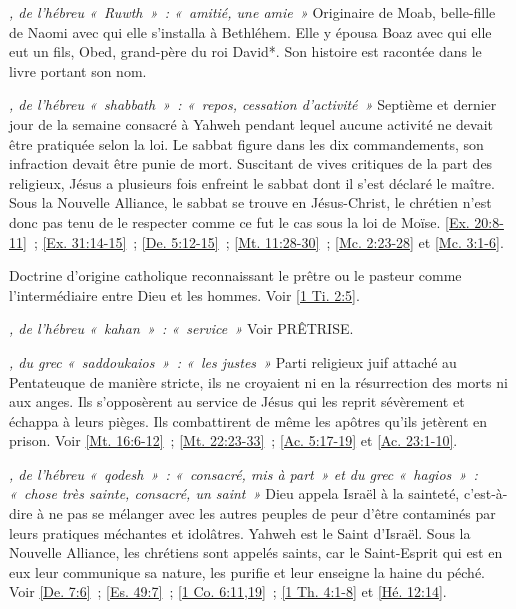 \begin{multicols}{2}
\textit{, de l'hébreu «~Ruwth~»~: «~amitié, une amie~»}\newline
Originaire de Moab, belle-fille de Naomi avec qui elle s'installa à Bethléhem. Elle y épousa Boaz avec qui elle eut un fils, Obed, grand-père du roi David*. Son histoire est racontée dans le livre portant son nom.

\textit{, de l'hébreu «~shabbath~»~: «~repos, cessation d'activité~»}\newline
Septième et dernier jour de la semaine consacré à Yahweh pendant lequel aucune activité ne devait être pratiquée selon la loi. Le sabbat figure dans les dix commandements, son infraction devait être punie de mort. Suscitant de vives critiques de la part des religieux, Jésus a plusieurs fois enfreint le sabbat dont il s'est déclaré le maître. Sous la Nouvelle Alliance, le sabbat se trouve en Jésus-Christ, le chrétien n'est donc pas tenu de le respecter comme ce fut le cas sous la loi de Moïse. \vref{Ex. 20:8-11}~; \vref{Ex. 31:14-15}~; \vref{De. 5:12-15}~; \vref{Mt. 11:28-30}~; \vref{Mc. 2:23-28} et \vref{Mc. 3:1-6}.

\textit{}\newline
Doctrine d'origine catholique reconnaissant le prêtre ou le pasteur comme l'intermédiaire entre Dieu et les hommes. Voir \vref{1 Ti. 2:5}.

\textit{, de l'hébreu «~kahan~»~: «~service~»}\newline
Voir PRÊTRISE.

\textit{, du grec «~saddoukaios~»~: «~les justes~»}\newline
Parti religieux juif attaché au Pentateuque de manière stricte, ils ne croyaient ni en la résurrection des morts ni aux anges. Ils s'opposèrent au service de Jésus qui les reprit sévèrement et échappa à leurs pièges. Ils combattirent de même les apôtres qu'ils jetèrent en prison.\newline
Voir \vref{Mt. 16:6-12}~; \vref{Mt. 22:23-33}~; \vref{Ac. 5:17-19} et \vref{Ac. 23:1-10}.

\textit{, de l'hébreu «~qodesh~»~: «~consacré, mis à part~» et du grec «~hagios~»~: «~chose très sainte, consacré, un saint~»}\newline
Dieu appela Israël à la sainteté, c'est-à-dire à ne pas se mélanger avec les autres peuples de peur d'être contaminés par leurs pratiques méchantes et idolâtres. Yahweh est le Saint d'Israël. Sous la Nouvelle Alliance, les chrétiens sont appelés saints, car le Saint-Esprit qui est en eux leur communique sa nature, les purifie et leur enseigne la haine du péché. Voir \vref{De. 7:6}~; \vref{Es. 49:7}~; \vref{1 Co. 6:11,19}~; \vref{1 Th. 4:1-8} et \vref{Hé. 12:14}.


\end{multicols}
